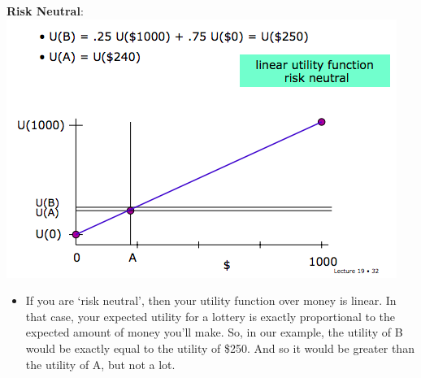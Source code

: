 \documentclass[12pt]{article}
\begin{document}
\begin{tcolorbox}
\textbf{Risk Neutral}:\\

\includegraphics[scale=0.5]{p10}\\

\begin{itemize}
\item  If you are `risk neutral', then your utility
function over money is linear. In that case, your expected utility for a lottery
is exactly proportional to the expected amount of money you'll make. So, in
our example, the utility of B would be exactly equal to the utility of \$250. And
so it would be greater than the utility of A, but not a lot.
\end{itemize}

\end{tcolorbox}
\end{document}
